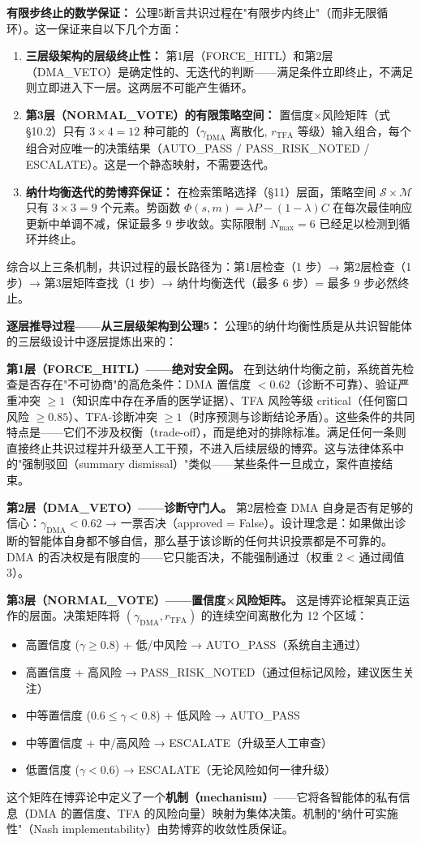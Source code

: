 \documentclass[11pt,a4paper]{ctexart}
\theoremstyle{remark}
\begin{document}
\textbf{有限步终止的数学保证：} 公理5断言共识过程在"有限步内终止"（而非无限循环）。这一保证来自以下几个方面：
\begin{enumerate}[nosep]
\item \textbf{三层级架构的层级终止性：} 第1层（FORCE\_HITL）和第2层（DMA\_VETO）是确定性的、无迭代的判断——满足条件立即终止，不满足则立即进入下一层。这两层不可能产生循环。
\item \textbf{第3层（NORMAL\_VOTE）的有限策略空间：} 置信度×风险矩阵（式 §10.2）只有 $3 \times 4 = 12$ 种可能的（$\gamma_{\text{DMA}}$ 离散化, $r_{\text{TFA}}$ 等级）输入组合，每个组合对应唯一的决策结果（AUTO\_PASS / PASS\_RISK\_NOTED / ESCALATE）。这是一个静态映射，不需要迭代。
\item \textbf{纳什均衡迭代的势博弈保证：} 在检索策略选择（§11）层面，策略空间 $\mathcal{S} \times \mathcal{M}$ 只有 $3 \times 3 = 9$ 个元素。势函数 $\Phi(s,m) = \lambda P - (1-\lambda)C$ 在每次最佳响应更新中单调不减，保证最多 9 步收敛。实际限制 $N_{\max}=6$ 已经足以检测到循环并终止。
\end{enumerate}
综合以上三条机制，共识过程的最长路径为：第1层检查（1 步）→ 第2层检查（1 步）→ 第3层矩阵查找（1 步）→ 纳什均衡迭代（最多 6 步）= 最多 9 步必然终止。

\textbf{逐层推导过程——从三层级架构到公理5：}
公理5的纳什均衡性质是从共识智能体的三层级设计中逐层提炼出来的：

\textbf{第1层（FORCE\_HITL）——绝对安全网。} 在到达纳什均衡之前，系统首先检查是否存在"不可协商"的高危条件：DMA 置信度 $< 0.62$（诊断不可靠）、验证严重冲突 $\geq 1$（知识库中存在矛盾的医学证据）、TFA 风险等级 critical（任何窗口风险 $\geq 0.85$）、TFA-诊断冲突 $\geq 1$（时序预测与诊断结论矛盾）。这些条件的共同特点是——它们不涉及权衡（trade-off），而是绝对的排除标准。满足任何一条则直接终止共识过程并升级至人工干预，不进入后续层级的博弈。这与法律体系中的"强制驳回（summary dismissal）"类似——某些条件一旦成立，案件直接结束。

\textbf{第2层（DMA\_VETO）——诊断守门人。} 第2层检查 DMA 自身是否有足够的信心：$\gamma_{\text{DMA}} < 0.62$ → 一票否决（approved = False）。设计理念是：如果做出诊断的智能体自身都不够自信，那么基于该诊断的任何共识投票都是不可靠的。DMA 的否决权是有限度的——它只能否决，不能强制通过（权重 2 < 通过阈值 3）。

\textbf{第3层（NORMAL\_VOTE）——置信度×风险矩阵。} 这是博弈论框架真正运作的层面。决策矩阵将 $(\gamma_{\text{DMA}}, r_{\text{TFA}})$ 的连续空间离散化为 12 个区域：
\begin{itemize}[nosep]
\item 高置信度 ($\gamma \geq 0.8$) + 低/中风险 → AUTO\_PASS（系统自主通过）
\item 高置信度 + 高风险 → PASS\_RISK\_NOTED（通过但标记风险，建议医生关注）
\item 中等置信度 ($0.6 \leq \gamma < 0.8$) + 低风险 → AUTO\_PASS
\item 中等置信度 + 中/高风险 → ESCALATE（升级至人工审查）
\item 低置信度 ($\gamma < 0.6$) → ESCALATE（无论风险如何一律升级）
\end{itemize}
这个矩阵在博弈论中定义了一个\textbf{机制（mechanism）}——它将各智能体的私有信息（DMA 的置信度、TFA 的风险向量）映射为集体决策。机制的"纳什可实施性"（Nash implementability）由势博弈的收敛性质保证。
\end{document}
